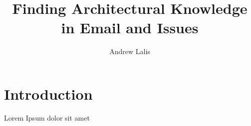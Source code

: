 \documentclass{article}
\title{Finding Architectural Knowledge in Email and Issues}
\author{Andrew Lalis}
\begin{document}
\maketitle

\section*{Introduction}
Lorem Ipsum dolor sit amet
\end{document}
